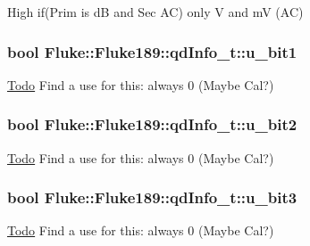 \label{structFluke_1_1Fluke189_1_1qdInfo__t_aec06148ae228f11298bf487bcabc630c}
High if(Prim is dB and Sec AC) only V and mV (AC) \hypertarget{structFluke_1_1Fluke189_1_1qdInfo__t_a49bb210666c03813d3e2dd5e7739c97f}{
\subsubsection[{u\_\-bit1}]{\setlength{\rightskip}{0pt plus 5cm}bool {\bf Fluke::Fluke189::qdInfo\_\-t::u\_\-bit1}}}
\label{structFluke_1_1Fluke189_1_1qdInfo__t_a49bb210666c03813d3e2dd5e7739c97f}
\begin{Desc}
\item[\hyperlink{todo__todo000008}{Todo}]Find a use for this: always 0 (Maybe Cal?) \end{Desc}
\hypertarget{structFluke_1_1Fluke189_1_1qdInfo__t_a3ee66a3c3b07169f2470fc7b8d832601}{
\subsubsection[{u\_\-bit2}]{\setlength{\rightskip}{0pt plus 5cm}bool {\bf Fluke::Fluke189::qdInfo\_\-t::u\_\-bit2}}}
\label{structFluke_1_1Fluke189_1_1qdInfo__t_a3ee66a3c3b07169f2470fc7b8d832601}
\begin{Desc}
\item[\hyperlink{todo__todo000009}{Todo}]Find a use for this: always 0 (Maybe Cal?) \end{Desc}
\hypertarget{structFluke_1_1Fluke189_1_1qdInfo__t_a1989b018d05ed21b310846a8cba4099e}{
\subsubsection[{u\_\-bit3}]{\setlength{\rightskip}{0pt plus 5cm}bool {\bf Fluke::Fluke189::qdInfo\_\-t::u\_\-bit3}}}
\label{structFluke_1_1Fluke189_1_1qdInfo__t_a1989b018d05ed21b310846a8cba4099e}
\begin{Desc}
\item[\hyperlink{todo__todo000010}{Todo}]Find a use for this: always 0 (Maybe Cal?) \end{Desc}
